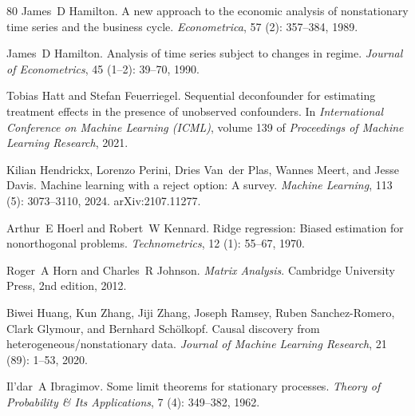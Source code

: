\begin{thebibliography}{80}
James~D Hamilton.
\newblock A new approach to the economic analysis of nonstationary time series and the business cycle.
\newblock \emph{Econometrica}, 57 (2): 357--384, 1989.

James~D Hamilton.
\newblock Analysis of time series subject to changes in regime.
\newblock \emph{Journal of Econometrics}, 45 (1--2): 39--70, 1990.

Tobias Hatt and Stefan Feuerriegel.
\newblock Sequential deconfounder for estimating treatment effects in the presence of unobserved confounders.
\newblock In \emph{International Conference on Machine Learning (ICML)}, volume 139 of \emph{Proceedings of Machine Learning Research}, 2021.

Kilian Hendrickx, Lorenzo Perini, Dries Van~der Plas, Wannes Meert, and Jesse Davis.
\newblock Machine learning with a reject option: A survey.
\newblock \emph{Machine Learning}, 113 (5): 3073--3110, 2024.
\newblock arXiv:2107.11277.

Arthur~E Hoerl and Robert~W Kennard.
\newblock Ridge regression: Biased estimation for nonorthogonal problems.
\newblock \emph{Technometrics}, 12 (1): 55--67, 1970.

Roger~A Horn and Charles~R Johnson.
\newblock \emph{Matrix Analysis}.
\newblock Cambridge University Press, 2nd edition, 2012.

Biwei Huang, Kun Zhang, Jiji Zhang, Joseph Ramsey, Ruben Sanchez-Romero, Clark Glymour, and Bernhard Sch{\"o}lkopf.
\newblock Causal discovery from heterogeneous/nonstationary data.
\newblock \emph{Journal of Machine Learning Research}, 21 (89): 1--53, 2020.
\newblock

Il'dar~A Ibragimov.
\newblock Some limit theorems for stationary processes.
\newblock \emph{Theory of Probability \& Its Applications}, 7 (4): 349--382, 1962.


\end{thebibliography}

